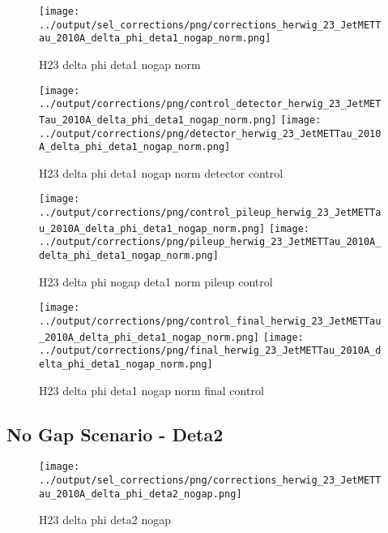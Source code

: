 \documentclass[11pt]{book}
\begin{document}
\begin{figure}[ht]
\centering
\texttt{[image: ../output/sel\_corrections/png/corrections\_herwig\_23\_JetMETTau\_2010A\_delta\_phi\_deta1\_nogap\_norm.png]}
\caption{H23 delta phi deta1 nogap norm}
\label{fig:H23_JetMETTau_2010A_delta_phi_deta1_nogap_norm}
\end{figure}

\begin{figure}[ht]
\centering
\texttt{[image: ../output/corrections/png/control\_detector\_herwig\_23\_JetMETTau\_2010A\_delta\_phi\_deta1\_nogap\_norm.png]}
\texttt{[image: ../output/corrections/png/detector\_herwig\_23\_JetMETTau\_2010A\_delta\_phi\_deta1\_nogap\_norm.png]}
\caption{H23 delta phi deta1 nogap norm detector control}
\label{fig:H23_JetMETTau_2010A_delta_phi_deta1_nogap_norm_detector_control}
\end{figure}

\begin{figure}[ht]
\centering
\texttt{[image: ../output/corrections/png/control\_pileup\_herwig\_23\_JetMETTau\_2010A\_delta\_phi\_deta1\_nogap\_norm.png]}
\texttt{[image: ../output/corrections/png/pileup\_herwig\_23\_JetMETTau\_2010A\_delta\_phi\_deta1\_nogap\_norm.png]}
\caption{H23 delta phi nogap deta1 norm pileup control}
\label{fig:H23_JetMETTau_2010A_delta_phi_deta1_nogap_norm_pileup_control}
\end{figure}


\begin{figure}[ht]
\centering
\texttt{[image: ../output/corrections/png/control\_final\_herwig\_23\_JetMETTau\_2010A\_delta\_phi\_deta1\_nogap\_norm.png]}
\texttt{[image: ../output/corrections/png/final\_herwig\_23\_JetMETTau\_2010A\_delta\_phi\_deta1\_nogap\_norm.png]}
\caption{H23 delta phi deta1 nogap norm final control}
\label{fig:H23_JetMETTau_2010A_delta_phi_deta1_nogap_norm_final_control}
\end{figure}


\clearpage
\subsection{No Gap Scenario - Deta2}
\begin{figure}[ht]
\centering
\texttt{[image: ../output/sel\_corrections/png/corrections\_herwig\_23\_JetMETTau\_2010A\_delta\_phi\_deta2\_nogap.png]}
\caption{H23 delta phi deta2 nogap}
\label{fig:H23_JetMETTau_2010A_delta_phi_deta2_nogap}
\end{figure}
\end{document}
